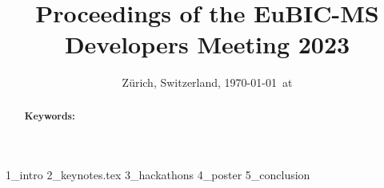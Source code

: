 \documentclass[11pt,a4paper,DIV=21,abstract=true,twocolumn]{scrartcl}
\title{Proceedings of the EuBIC-MS Developers Meeting 2023}
\author{
	
}
\date{{\small Zürich, Switzerland, \today\ at \currenttime}}
\begin{document}
\maketitle

\begin{abstract}
	
	\vspace{0.5cm}
	\textbf{Keywords:
	}
	
\end{abstract}


 {1_intro}
 {2_keynotes.tex}
 {3_hackathons}
 {4_poster}
 {5_conclusion}

%
%



\begin{table*}[ht]
\centering
\label{tab:affiliation}

\caption{Author affiliation; grouped and ordered by affiliation.}
\end{table*}
\end{document}
